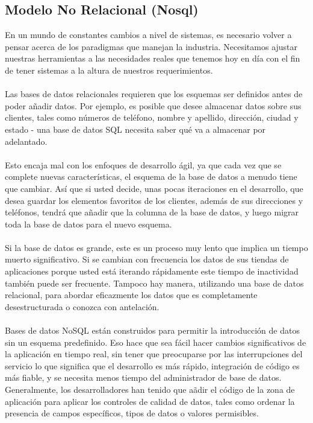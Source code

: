 \documentclass[10pt,a4paper]{article}
\begin{document}
\subsection{Modelo No Relacional (Nosql)}

En un mundo de constantes cambios a nivel de sistemas, es necesario volver a pensar acerca de los paradigmas que manejan la industria. Necesitamos ajustar nuestras herramientas a las necesidades reales que tenemos hoy en d\'ia con el fin de tener sistemas a la altura de nuestros requerimientos.
\\
\\
Las bases de datos relacionales requieren que los esquemas ser definidos antes de poder a\~nadir datos. Por ejemplo, es posible que desee almacenar datos sobre sus clientes, tales como n\'umeros de tel\'efono, nombre y apellido, direcci\'on, ciudad y estado - una base de datos SQL necesita saber qu\'e va a almacenar por adelantado.
\\
\\
Esto encaja mal con los enfoques de desarrollo \'agil, ya que cada vez que se complete nuevas caracter\'isticas, el esquema de la base de datos a menudo tiene que cambiar. As\'i que si usted decide, unas pocas iteraciones en el desarrollo, que desea guardar los elementos favoritos de los clientes, adem\'as de sus direcciones y tel\'efonos, tendr\'a que a\~nadir que la columna de la base de datos, y luego migrar toda la base de datos para el nuevo esquema.
\\
\\
Si la base de datos es grande, este es un proceso muy lento que implica un tiempo muerto significativo. Si se cambian con frecuencia los datos de sus tiendas de aplicaciones porque usted est\'a iterando r\'apidamente este tiempo de inactividad tambi\'en puede ser frecuente. Tampoco hay manera, utilizando una base de datos relacional, para abordar eficazmente los datos que es completamente desestructurada o conozca con antelaci\'on.
\\
\\
Bases de datos NoSQL est\'an construidos para permitir la introducci\'on de datos sin un esquema predefinido. Eso hace que sea f\'acil hacer cambios significativos de la aplicaci\'on en tiempo real, sin tener que preocuparse por las interrupciones del servicio lo que significa que el desarrollo es m\'as r\'apido, integraci\'on de c\'odigo es m\'as fiable, y se necesita menos tiempo del administrador de base de datos. Generalmente, los desarrolladores han tenido que a\~adir el c\'odigo de la zona de aplicaci\'on para aplicar los controles de calidad de datos, tales como ordenar la presencia de campos espec\'ificos, tipos de datos o valores permisibles.
\end{document}
